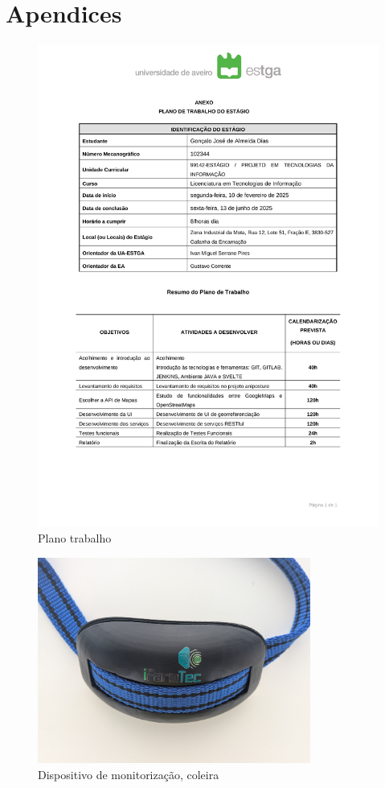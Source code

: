 \chapter{Apendices}

\begin{figure}[h!]
	\centering
    \includegraphics[width=\textwidth]{figs/plano.pdf}
    \caption[Plano trabalho]{Plano trabalho}
    \label{fig:work_plan}
\end{figure}

\begin{figure}[h!]
	\centering
    \includegraphics[width=0.8\textwidth]{figs/col1.jpg}
    \caption{Dispositivo de monitorização, coleira}
    \label{fig:col1}
\end{figure}

